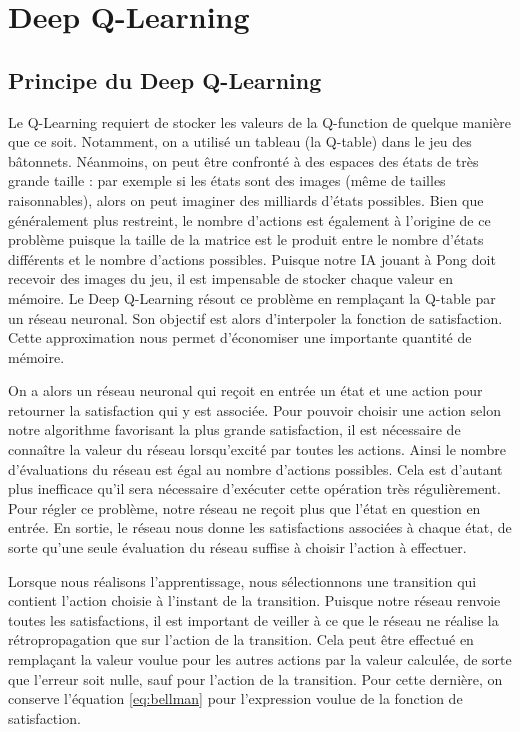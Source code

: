 \section{Deep Q-Learning}

\subsection{Principe du Deep Q-Learning}

Le Q-Learning requiert de stocker les valeurs de la Q-function de quelque manière que ce soit. Notamment, on a utilisé un tableau (la Q-table) dans le jeu des
bâtonnets. Néanmoins, on peut être confronté à des espaces des états de très grande taille : par exemple si les états sont des images (même de tailles raisonnables), 
alors on peut imaginer des milliards d'états possibles. Bien que généralement plus restreint, le nombre d'actions est également à l'origine de ce problème puisque la
taille de la matrice est le produit entre le nombre d'états différents et le nombre d'actions possibles. Puisque notre IA jouant à Pong doit recevoir des images du jeu,
il est impensable de stocker chaque valeur en mémoire. Le Deep Q-Learning résout ce problème en remplaçant la Q-table par un réseau neuronal. Son objectif est alors 
d'interpoler la fonction de satisfaction. Cette approximation nous permet d'économiser une importante quantité de mémoire.

On a alors un réseau neuronal qui reçoit en entrée un état et une action pour retourner la satisfaction qui y est associée. Pour pouvoir choisir une action selon
notre algorithme favorisant la plus grande satisfaction, il est nécessaire de connaître la valeur du réseau lorsqu'excité par toutes les actions. Ainsi
le nombre d'évaluations du réseau est égal au nombre d'actions possibles. Cela est d'autant plus inefficace qu'il sera nécessaire d'exécuter cette opération très
régulièrement. Pour régler ce problème, notre réseau ne reçoit plus que l'état en question en entrée. En sortie, le réseau nous donne les satisfactions associées à chaque 
état, de sorte qu'une seule évaluation du réseau suffise à choisir l'action à effectuer.

Lorsque nous réalisons l'apprentissage, nous sélectionnons une transition qui contient l'action choisie à l'instant de la transition. Puisque notre réseau renvoie
toutes les satisfactions, il est important de veiller à ce que le réseau ne réalise la rétropropagation que sur l'action de la transition. Cela peut être 
effectué en remplaçant la valeur voulue pour les autres actions par la valeur calculée, de sorte que l'erreur soit nulle, sauf pour l'action de la transition.
Pour cette dernière, on conserve l'équation \ref{eq:bellman} pour l'expression voulue de la fonction de satisfaction.

